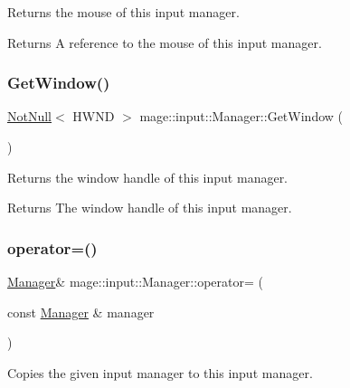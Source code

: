 Returns the mouse of this input manager.

\begin{DoxyReturn}{Returns}
A reference to the mouse of this input manager. 
\end{DoxyReturn}
\hypertarget{classmage_1_1input_1_1_manager_aca0295dd551eba67329740599a80f24d}{}\label{classmage_1_1input_1_1_manager_aca0295dd551eba67329740599a80f24d} 
\subsubsection{\texorpdfstring{Get\+Window()}{GetWindow()}}
{\footnotesize\ttfamily \hyperlink{namespacemage_a8769f9d670d6b585ea306cb1062af94b}{Not\+Null}$<$ H\+W\+ND $>$ mage\+::input\+::\+Manager\+::\+Get\+Window (\begin{DoxyParamCaption}{ }\end{DoxyParamCaption})\hspace{0.3cm}{\ttfamily [noexcept]}}

Returns the window handle of this input manager.

\begin{DoxyReturn}{Returns}
The window handle of this input manager. 
\end{DoxyReturn}
\hypertarget{classmage_1_1input_1_1_manager_a5fb8b5797f2048cf31fb4c2a05ba5d02}{}\label{classmage_1_1input_1_1_manager_a5fb8b5797f2048cf31fb4c2a05ba5d02} 
\subsubsection{\texorpdfstring{operator=()}{operator=()}\hspace{0.1cm}{\footnotesize\ttfamily [1/2]}}
{\footnotesize\ttfamily \hyperlink{classmage_1_1input_1_1_manager}{Manager}\& mage\+::input\+::\+Manager\+::operator= (\begin{DoxyParamCaption}\item[{const \hyperlink{classmage_1_1input_1_1_manager}{Manager} \&}]{manager }\end{DoxyParamCaption})\hspace{0.3cm}{\ttfamily [delete]}}

Copies the given input manager to this input manager.


